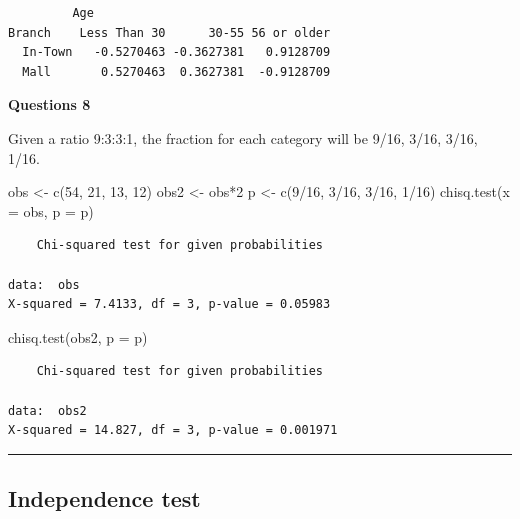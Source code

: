 \documentclass[
]{article}
\newenvironment{Shaded}{\begin{snugshade}}{\end{snugshade}}
\newcommand{\AttributeTok}[1]{\textcolor[rgb]{0.77,0.63,0.00}{#1}}
\newcommand{\DecValTok}[1]{\textcolor[rgb]{0.00,0.00,0.81}{#1}}
\newcommand{\FunctionTok}[1]{\textcolor[rgb]{0.00,0.00,0.00}{#1}}
\newcommand{\NormalTok}[1]{#1}
\newcommand{\OtherTok}[1]{\textcolor[rgb]{0.56,0.35,0.01}{#1}}
\newcommand{\SpecialCharTok}[1]{\textcolor[rgb]{0.00,0.00,0.00}{#1}}
\begin{document}
\begin{verbatim}
         Age
Branch    Less Than 30      30-55 56 or older
  In-Town   -0.5270463 -0.3627381   0.9128709
  Mall       0.5270463  0.3627381  -0.9128709
\end{verbatim}

\textbf{Questions 8}

Given a ratio 9:3:3:1, the fraction for each category will be 9/16, 3/16, 3/16, 1/16.

\begin{Shaded}
\begin{Highlighting}[]
\NormalTok{obs }\OtherTok{\textless{}{-}} \FunctionTok{c}\NormalTok{(}\DecValTok{54}\NormalTok{, }\DecValTok{21}\NormalTok{, }\DecValTok{13}\NormalTok{, }\DecValTok{12}\NormalTok{)}
\NormalTok{obs2 }\OtherTok{\textless{}{-}}\NormalTok{ obs}\SpecialCharTok{*}\DecValTok{2}
\NormalTok{p }\OtherTok{\textless{}{-}} \FunctionTok{c}\NormalTok{(}\DecValTok{9}\SpecialCharTok{/}\DecValTok{16}\NormalTok{, }\DecValTok{3}\SpecialCharTok{/}\DecValTok{16}\NormalTok{, }\DecValTok{3}\SpecialCharTok{/}\DecValTok{16}\NormalTok{, }\DecValTok{1}\SpecialCharTok{/}\DecValTok{16}\NormalTok{)}
\FunctionTok{chisq.test}\NormalTok{(}\AttributeTok{x =}\NormalTok{ obs, }\AttributeTok{p =}\NormalTok{ p)}
\end{Highlighting}
\end{Shaded}

\begin{verbatim}
    Chi-squared test for given probabilities

data:  obs
X-squared = 7.4133, df = 3, p-value = 0.05983
\end{verbatim}

\begin{Shaded}
\begin{Highlighting}[]
\FunctionTok{chisq.test}\NormalTok{(obs2, }\AttributeTok{p =}\NormalTok{ p)}
\end{Highlighting}
\end{Shaded}

\begin{verbatim}
    Chi-squared test for given probabilities

data:  obs2
X-squared = 14.827, df = 3, p-value = 0.001971
\end{verbatim}

\begin{center}\rule{0.5\linewidth}{0.5pt}\end{center}

\hypertarget{independence-test}{%
\subsection{Independence test}\label{independence-test}}
\end{document}
